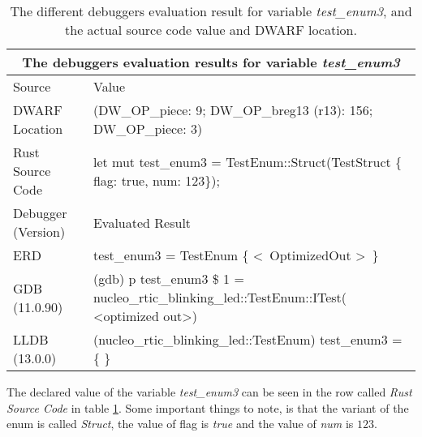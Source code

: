 \begin{table}[h]
	\centering
	\small
	\begin{tabular}{ |p{2cm}|p{8cm}|  }
		\hline
		\multicolumn{2}{|c|}{\textbf{The debuggers evaluation results for variable \emph{test\_enum3}}} \\ 
		\hline
		\hline
		Source & Value \\
		\hline

		DWARF Location & (DW\_OP\_piece: 9; DW\_OP\_breg13 (r13): 156; DW\_OP\_piece: 3) \\

		Rust Source Code & let mut test\_enum3 = TestEnum::Struct(TestStruct \{ flag: true, num: 123\}); \\
		\hline
		\hline
		Debugger (Version) & Evaluated Result \\
		\hline
		ERD & test\_enum3 = 
		TestEnum \{ \textless \ OptimizedOut \textgreater \ \}\\

		GDB (11.0.90)  & (gdb) p test\_enum3\newline
		\$ 1 = nucleo\_rtic\_blinking\_led::TestEnum::ITest(\newline
		\textless optimized out\textgreater) \\

		LLDB (13.0.0) & (nucleo\_rtic\_blinking\_led::TestEnum) test\_enum3 = \{\newline
		\text{\ \ ITest = (0 = 0)}\newline
		\text{\ \ UTest = (0 = 0)}\newline
		\text{\ \ Struct = \{}\newline
		\text{\ \ \ \ 0 = (flag = false, num = 0)}\newline
		\text{\ \ \}}\newline
		\text{\ \ Non = \{\}}\newline
		\} \\
		\hline
	\end{tabular}
	\label{table:enum3}
	\caption{The different debuggers evaluation result for variable \emph{test\_enum3}, and the actual source code value and DWARF location.}
\end{table}


The declared value of the variable \emph{test\_enum3} can be seen in the row called \emph{Rust Source Code} in table \ref{table:enum3}.
Some important things to note, is that the variant of the enum is called \emph{Struct}, the value of flag is \emph{true} and the value of \emph{num} is $123$.


